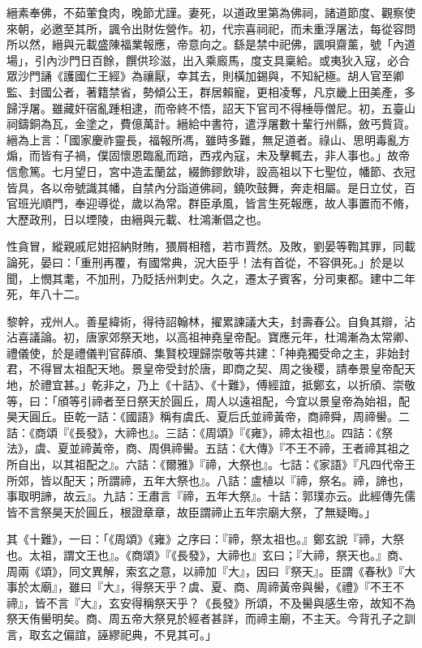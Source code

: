 \begin{pinyinscope}
 縉素奉佛，不茹葷食肉，晚節尤謹。妻死，以道政里第為佛祠，諸道節度、觀察使來朝，必邀至其所，諷令出財佐營作。初，代宗喜祠祀，而未重浮屠法，每從容問所以然，縉與元載盛陳福業報應，帝意向之。繇是禁中祀佛，諷唄齋薰，號「內道場」，引內沙門日百餘，饌供珍滋，出入乘廄馬，度支具稟給。或夷狄入寇，必合眾沙門誦《護國仁王經》為禳厭，幸其去，則橫加錫與，不知紀極。胡人官至卿監、封國公者，著籍禁省，勢傾公王，群居賴寵，更相凌奪，凡京畿上田美產，多歸浮屠。雖藏奸宿亂踵相逮，而帝終不悟，詔天下官司不得棰辱僧尼。初，五臺山祠鑄銅為瓦，金塗之，費億萬計。縉給中書符，遣浮屠數十輩行州縣，斂丐貲貨。縉為上言：「國家慶祚靈長，福報所馮，雖時多難，無足道者。祿山、思明毒亂方煽，而皆有子禍，僕固懷恩臨亂而踣，西戎內寇，未及擊輒去，非人事也。」故帝信愈篤。七月望日，宮中造盂蘭盆，綴飾鏐飲琲，設高祖以下七聖位，幡節、衣冠皆具，各以帝號識其幡，自禁內分詣道佛祠，鐃吹鼓舞，奔走相屬。是日立仗，百官班光順門，奉迎導從，歲以為常。群臣承風，皆言生死報應，故人事置而不脩，大歷政刑，日以堙陵，由縉與元載、杜鴻漸倡之也。



 性貪冒，縱親戚尼姏招納財賄，猥屑相稽，若市賈然。及敗，劉晏等鞫其罪，同載論死，晏曰：「重刑再覆，有國常典，況大臣乎！法有首從，不容俱死。」於是以聞，上憫其耄，不加刑，乃貶括州刺史。久之，遷太子賓客，分司東都。建中二年死，年八十二。



 黎幹，戎州人。善星緯術，得待詔翰林，擢累諫議大夫，封壽春公。自負其辯，沾沾喜議論。初，唐家郊祭天地，以高祖神堯皇帝配。寶應元年，杜鴻漸為太常卿、禮儀使，於是禮儀判官薛頎、集賢校理歸崇敬等共建：「神堯獨受命之主，非始封君，不得冒太祖配天地。景皇帝受封於唐，即商之契、周之後稷，請奉景皇帝配天地，於禮宜甚。」乾非之，乃上《十詰》、《十難》，傅經誼，抵鄭玄，以折頎、崇敬等，曰：「頎等引禘者至日祭天於圓丘，周人以遠祖配，今宜以景皇帝為始祖，配昊天圓丘。臣乾一詰：《國語》稱有虞氏、夏后氏並禘黃帝，商禘舜，周禘嚳。二詰：《商頌『《長發》，大禘也』。三詰：《周頌》『《雍》，禘太祖也』。四詰：《祭法》，虞、夏並禘黃帝，商、周俱禘嚳。五詰：《大傳》『不王不禘，王者禘其祖之所自出，以其祖配之』。六詰：《爾雅》『禘，大祭也』。七詰：《家語》『凡四代帝王所郊，皆以配天；所謂禘，五年大祭也』。八詰：盧植以『禘，祭名。禘，諦也，事取明諦，故云』。九詰：王肅言『禘，五年大祭』。十詰：郭璞亦云。此經傳先儒皆不言祭昊天於圓丘，根證章章，故臣謂禘止五年宗廟大祭，了無疑晦。」



 其《十難》，一曰：「《周頌》《雍》之序曰：『禘，祭太祖也。』鄭玄說『禘，大祭也。太祖，謂文王也』。《商頌》『《長發》，大禘也』玄曰；『大禘，祭天也。』商、周兩《頌》，同文異解，索玄之意，以禘加『大』，因曰『祭天』。臣謂《春秋》『大事於太廟』，雖曰『大』，得祭天乎？虞、夏、商、周禘黃帝與嚳，《禮》『不王不禘』，皆不言『大』，玄安得稱祭天乎？《長發》所頌，不及嚳與感生帝，故知不為祭天侑嚳明矣。商、周五帝大祭見於經者甚詳，而禘主廟，不主天。今背孔子之訓言，取玄之偏誼，誣繆祀典，不見其可。」




\end{pinyinscope}

